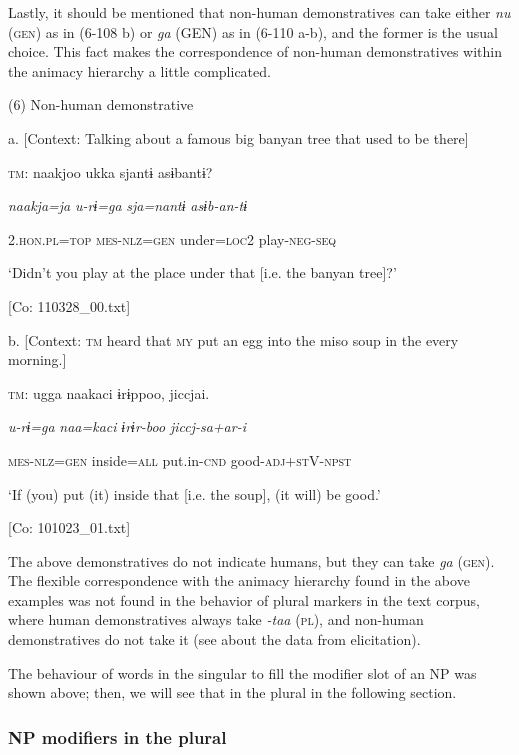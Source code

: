   Lastly, it should be mentioned that non-human demonstratives can take either \textit{nu} (\textsc{gen}) as in (6-108 b) or \textit{ga} (GEN) as in (6-110 a-b), and the former is the usual choice. This fact makes the correspondence of non-human demonstratives within the animacy hierarchy a little complicated.

(6)  Non-human demonstrative

  a.  [Context: Talking about a famous big banyan tree that used to be there]

    \textsc{tm}:  naakjoo  ukka  sjantɨ  asɨbantɨ?

      \textit{naakja=ja}  \textit{u-rɨ=ga}  \textit{sja=nantɨ}  \textit{asɨb-an-tɨ}

      2.\textsc{hon}.\textsc{pl}=\textsc{top}  \textsc{mes}-\textsc{nlz}=\textsc{gen}  under=\textsc{loc}2  play-\textsc{neg}-\textsc{seq}

      ‘Didn’t you play at the place under that [i.e. the banyan tree]?’

      [Co: 110328\_00.txt]

  b.  [Context: \textsc{tm} heard that \textsc{my} put an egg into the miso soup in the every morning.]

    \textsc{tm}:  ugga  naakaci  ɨrɨppoo,  jiccjai.

      \textit{u-rɨ=ga}  \textit{naa=kaci}  \textit{ɨrɨr-boo}  \textit{jiccj-sa+ar-i}

      \textsc{mes}-\textsc{nlz}=\textsc{gen}  inside=\textsc{all}  put.in-\textsc{cnd}  good-\textsc{adj}+\textsc{st}V-\textsc{npst}

      ‘If (you) put (it) inside that [i.e. the soup], (it will) be good.’

      [Co: 101023\_01.txt]

The above demonstratives do not indicate humans, but they can take \textit{ga} (\textsc{gen}). The flexible correspondence with the animacy hierarchy found in the above examples was not found in the behavior of plural markers in the text corpus, where human demonstratives always take \textit{{}-taa} (\textsc{pl}), and non-human demonstratives do not take it (see  about the data from elicitation).

  The behaviour of words in the singular to fill the modifier slot of an NP was shown above; then, we will see that in the plural in the following section.

\subsubsection{NP modifiers in the plural}

